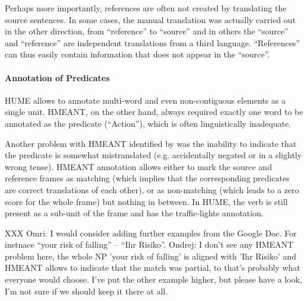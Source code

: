 \documentclass[11pt]{article}
\newcommand{\XXX}[1]{{\color{red}XXX #1}} %
\def\perscite#1{\newcite{#1}}
\begin{document}
Perhaps more importantly, references are often not created by translating the source
sentences. In some cases, the manual translation was actually carried out in the
other direction, from ``reference'' to ``source''
and in others the ``source'' and ``reference'' are independent translations
from a third language. ``References'' can thus easily contain information
that does not appear in the ``source''.


\paragraph{Annotation of Predicates}

HUME allows to annotate multi-word and even
non-contiguous elements as a single unit. HMEANT, on the other hand, always
required exactly one word to be annotated as the predicate (``Action''), which
is often linguistically inadequate.

Another problem with HMEANT identified by \perscite{bojar:wu:ssst:2012} was the
inability to indicate that the predicate is somewhat mistranslated (e.g.
accidentally negated or in a slightly wrong tense). HMEANT
annotation allows either to mark the source and reference frames as matching
(which implies that the corresponding predicates are correct translations of each
other), or as non-matching (which leads to a zero score for the whole frame) but
nothing in between. In HUME, the verb is still present as a sub-unit of the
frame and has the traffic-lights annotation.

\XXX{Omri: I would consider adding further examples from the Google Doc. For instnace
``your risk of falling'' -- ``Ihr Risiko''.
Ondrej: I don't see any HMEANT problem here, the whole NP 'your risk of falling'
is aligned with 'Ihr Risiko' and HMEANT allows to indicate that the match was
partial, to that's probably what everyone would choose. I've put the other
example higher, but please have a look, I'm not sure if we should keep it there
at all.}
  
% 
% 
% 
% 
% 
\end{document}
